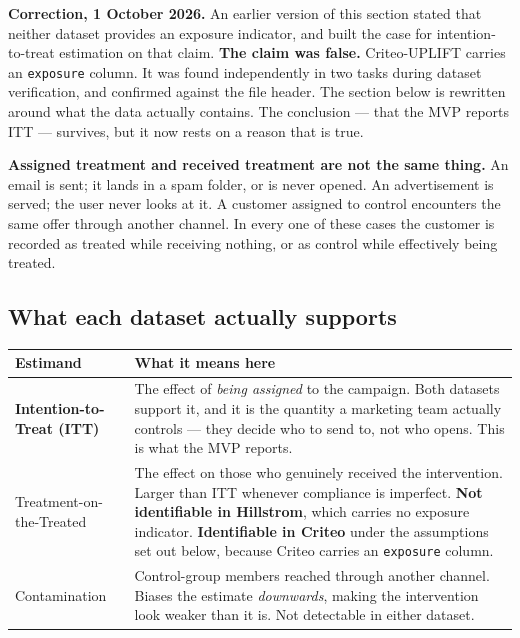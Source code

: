 \documentclass[11pt,a4paper]{article}
\begin{document}
\begin{alertbox}
\textbf{Correction, 1 October 2026.} An earlier version of this section stated that neither dataset
provides an exposure indicator, and built the case for intention-to-treat estimation on that claim.
\textbf{The claim was false.} Criteo-UPLIFT carries an \texttt{exposure} column. It was found
independently in two tasks during dataset verification, and confirmed against the file header. The
section below is rewritten around what the data actually contains. The conclusion --- that the MVP
reports ITT --- survives, but it now rests on a reason that is true.
\end{alertbox}

\begin{alertbox}
\textbf{Assigned treatment and received treatment are not the same thing.} An email is sent; it
lands in a spam folder, or is never opened. An advertisement is served; the user never looks at it.
A customer assigned to control encounters the same offer through another channel. In every one of
these cases the customer is recorded as treated while receiving nothing, or as control while
effectively being treated.
\end{alertbox}

\subsection{What each dataset actually supports}

\begin{tabularx}{\textwidth}{@{}L{4.6cm}X@{}}
\toprule
\textbf{Estimand} & \textbf{What it means here} \\
\midrule
\textbf{Intention-to-Treat (ITT)} & The effect of \emph{being assigned} to the campaign. Both
datasets support it, and it is the quantity a marketing team actually controls --- they decide who
to send to, not who opens. This is what the MVP reports. \\
Treatment-on-the-Treated & The effect on those who genuinely received the intervention. Larger than
ITT whenever compliance is imperfect. \textbf{Not identifiable in Hillstrom}, which carries no
exposure indicator. \textbf{Identifiable in Criteo} under the assumptions set out below, because
Criteo carries an \texttt{exposure} column. \\
Contamination & Control-group members reached through another channel. Biases the estimate
\emph{downwards}, making the intervention look weaker than it is. Not detectable in either dataset. \\
\bottomrule
\end{tabularx}
\end{document}
